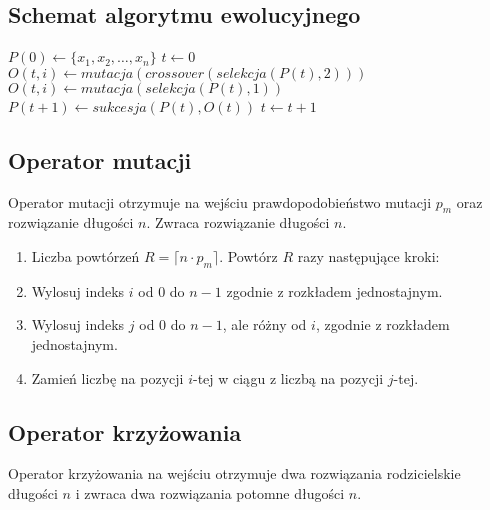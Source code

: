 \documentclass[12pt, a4paper]{article}
\begin{document}
\subsection{Schemat algorytmu ewolucyjnego}

\begin{algorithm}[!htb]
\label{ea}
\begin{algorithmic}[1]
	\State $P(0) \gets \{x_1, x_2, \ldots, x_n\}$
	\State $t \gets 0$
    			\State $O(t,i) \gets mutacja(crossover(selekcja(P(t), 2)))$
    		\Else
    			\State $O(t,i) \gets mutacja(selekcja(P(t),1))$
    		\EndIf
    	\EndFor
    \State $P(t+1) \gets sukcesja(P(t),O(t))$
    \State $t \gets t+1$
  	\EndWhile
\EndFunction
\end{algorithmic}
\end{algorithm}

\subsection{Operator mutacji}

Operator mutacji otrzymuje na wejściu prawdopodobieństwo mutacji $p_m$ oraz rozwiązanie długości $n$.
Zwraca rozwiązanie długości $n$.

\begin{enumerate}
 \item Liczba powtórzeń $R = \lceil n \cdot  p_m \rceil$. Powtórz $R$ razy następujące kroki:
 \item Wylosuj indeks $i$ od 0 do $n-1$ zgodnie z rozkładem jednostajnym.
 \item Wylosuj indeks $j$ od 0 do $n-1$, ale różny od $i$, zgodnie z rozkładem jednostajnym.
 \item Zamień liczbę na pozycji $i$-tej w ciągu z liczbą na pozycji $j$-tej.
\end{enumerate}

\subsection{Operator krzyżowania}

Operator krzyżowania na wejściu otrzymuje dwa rozwiązania rodzicielskie długości $n$ i zwraca dwa rozwiązania potomne długości $n$. 
\end{document}
